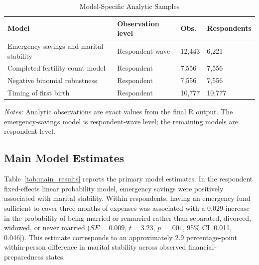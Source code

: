\documentclass[12pt]{article}
\begin{document}
\begin{table}[!htbp]
\centering
\caption{Model-Specific Analytic Samples}
\label{tab:model_samples}
\small
\begin{adjustbox}{max width=\textwidth}
\begin{tabularx}{\textwidth}{Y p{0.20\textwidth} p{0.16\textwidth} p{0.16\textwidth}}
\toprule
\textbf{Model} & \textbf{Observation level} & \textbf{Obs.} & \textbf{Respondents} \\
\midrule
Emergency savings and marital stability & Respondent-wave & 12,443 & 6,221 \\
Completed fertility count model & Respondent & 7,556 & 7,556 \\
Negative binomial robustness & Respondent & 7,556 & 7,556 \\
Timing of first birth & Respondent & 10,777 & 10,777 \\
\bottomrule
\end{tabularx}
\end{adjustbox}
\begin{minipage}{0.95\textwidth}
\footnotesize
\textit{Notes:} Analytic observations are exact values from the final R output. The emergency-savings model is respondent-wave level; the remaining models are respondent level.
\end{minipage}
\end{table}

\subsection{Main Model Estimates}

Table~\ref{tab:main_results} reports the primary model estimates. In the respondent fixed-effects linear probability model, emergency savings were positively associated with marital stability. Within respondents, having an emergency fund sufficient to cover three months of expenses was associated with a 0.029 increase in the probability of being married or remarried rather than separated, divorced, widowed, or never married ($SE = 0.009$, $t = 3.23$, $p = .001$, 95\% CI [0.011, 0.046]). This estimate corresponds to an approximately 2.9 percentage-point within-person difference in marital stability across observed financial-preparedness states.
\end{document}
